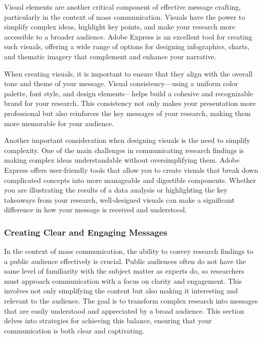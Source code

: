 \documentclass[
]{book}
\begin{document}
Visual elements are another critical component of effective message crafting, particularly in the context of mass communication. Visuals have the power to simplify complex ideas, highlight key points, and make your research more accessible to a broader audience. Adobe Express is an excellent tool for creating such visuals, offering a wide range of options for designing infographics, charts, and thematic imagery that complement and enhance your narrative.

When creating visuals, it is important to ensure that they align with the overall tone and theme of your message. Visual consistency---using a uniform color palette, font style, and design elements---helps build a cohesive and recognizable brand for your research. This consistency not only makes your presentation more professional but also reinforces the key messages of your research, making them more memorable for your audience.

Another important consideration when designing visuals is the need to simplify complexity. One of the main challenges in communicating research findings is making complex ideas understandable without oversimplifying them. Adobe Express offers user-friendly tools that allow you to create visuals that break down complicated concepts into more manageable and digestible components. Whether you are illustrating the results of a data analysis or highlighting the key takeaways from your research, well-designed visuals can make a significant difference in how your message is received and understood.

\subsubsection*{Creating Clear and Engaging Messages}\label{creating-clear-and-engaging-messages}

In the context of mass communication, the ability to convey research findings to a public audience effectively is crucial. Public audiences often do not have the same level of familiarity with the subject matter as experts do, so researchers must approach communication with a focus on clarity and engagement. This involves not only simplifying the content but also making it interesting and relevant to the audience. The goal is to transform complex research into messages that are easily understood and appreciated by a broad audience. This section delves into strategies for achieving this balance, ensuring that your communication is both clear and captivating.
\end{document}
